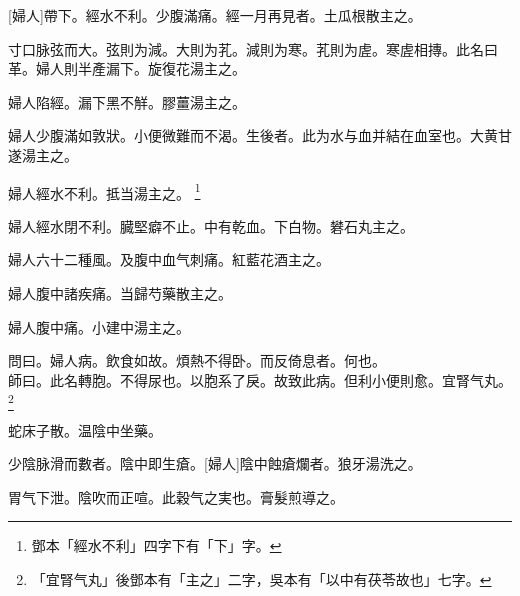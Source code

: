 \documentclass[12pt,twoside,UTF8,b5paper]{ctexbook}
\begin{document}
[婦人]帶下。經水不利。少腹滿痛。經一月再見者。土瓜根散主之。

寸口脉弦而大。弦則为減。大則为芤。減則为寒。芤則为虗。寒虗相摶。此名曰革。婦人則半產漏下。旋復花湯主之。

婦人陷經。漏下黑不觧。膠薑湯主之。

婦人少腹滿如敦狀。小便微難而不渴。生後者。此为水与血并結在血室也。大黄甘遂湯主之。

婦人經水不利。抵当湯主之。
	\footnote{鄧本「經水不利」四字下有「下」字。}

婦人經水閉不利。臓堅癖不止。中有乾血。下白物。礬石丸主之。

婦人六十二種風。及腹中血气刺痛。紅藍花酒主之。

婦人腹中諸疾痛。当歸芍藥散主之。

婦人腹中痛。小建中湯主之。

問曰。婦人病。飲食如故。煩熱不得卧。而反倚息者。何也。\\
師曰。此名轉胞。不得尿也。以胞系了戾。故致此病。但利小便則愈。宜腎气丸。
	\footnote{「宜腎气丸」後鄧本有「主之」二字，吳本有「以中有茯苓故也」七字。}

蛇床子散。温陰中坐藥。

少陰脉滑而數者。陰中即生瘡。[婦人]陰中蝕瘡爛者。狼牙湯洗之。

胃气下泄。陰吹而正喧。此穀气之実也。膏髮煎導之。
\end{document}
